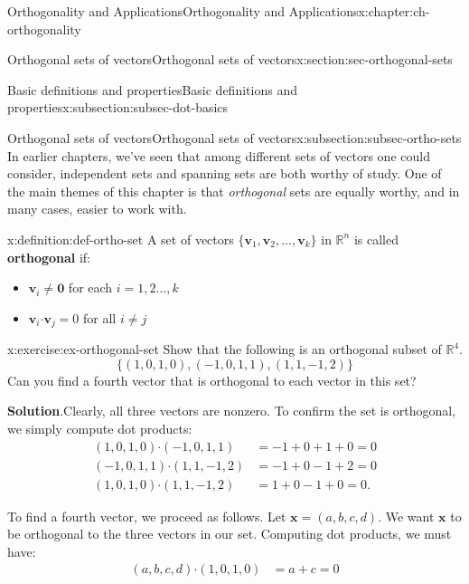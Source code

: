 \documentclass[oneside,10pt,]{book}
\newcommand{\blocktitlefont}{\relax}
\newcommand{\terminology}[1]{\textbf{#1}}
\numberwithin{equation}{section}
\newcommand{\R}{\mathbb{R}}
\newcommand{\dotp}{\!\boldsymbol{\cdot}\!}
\newcommand{\vv}{\mathbf{v}}
\newcommand{\xx}{\mathbf{x}}
\newcommand{\amp}{&}
\begin{document}
\begin{chapterptx}{Orthogonality and Applications}{}{Orthogonality and Applications}{}{}{x:chapter:ch-orthogonality}
\begin{sectionptx}{Orthogonal sets of vectors}{}{Orthogonal sets of vectors}{}{}{x:section:sec-orthogonal-sets}
\begin{subsectionptx}{Basic definitions and properties}{}{Basic definitions and properties}{}{}{x:subsection:subsec-dot-basics}
\end{subsectionptx}
%
%
\typeout{************************************************}
\typeout{************************************************}
%
\begin{subsectionptx}{Orthogonal sets of vectors}{}{Orthogonal sets of vectors}{}{}{x:subsection:subsec-ortho-sets}
In earlier chapters, we've seen that among different sets of vectors one could consider, independent sets and spanning sets are both worthy of study. One of the main themes of this chapter is that \emph{orthogonal} sets are equally worthy, and in many cases, easier to work with.%
\begin{definition}{}{x:definition:def-ortho-set}%
A set of vectors \(\{\vv_1,\vv_2,\ldots, \vv_k\}\) in \(\R^n\) is called \terminology{orthogonal} if:%
\begin{itemize}[label=\textbullet]
\item{}\(\vv_i\neq \mathbf{0}\) for each \(i=1,2\ldots, k\)%
\item{}\(\vv_i\dotp\vv_j = 0\) for all \(i\neq j\)%
\end{itemize}
%
\end{definition}
\begin{inlineexercise}{}{x:exercise:ex-orthogonal-set}%
Show that the following is an orthogonal subset of \(\R^4\).%
\begin{equation*}
\{(1,0,1,0), (-1,0,1,1), (1,1,-1,2)\}
\end{equation*}
Can you find a fourth vector that is orthogonal to each vector in this set?%
\par\smallskip%
\noindent\textbf{\blocktitlefont Solution}.\label{g:solution:idm45936166071552}{}\hypertarget{g:solution:idm45936166071552}{}\quad{}Clearly, all three vectors are nonzero. To confirm the set is orthogonal, we simply compute dot products:%
\begin{align*}
(1,0,1,0)\dotp (-1,0,1,1)\amp =-1+0+1+0=0\\
(-1,0,1,1)\dotp (1,1,-1,2)\amp =-1+0-1+2=0\\
(1,0,1,0)\dotp (1,1,-1,2) \amp = 1+0-1+0=0\text{.}
\end{align*}
%
\par
To find a fourth vector, we proceed as follows. Let \(\xx=(a,b,c,d)\). We want \(\xx\) to be orthogonal to the three vectors in our set. Computing dot products, we must have:%
\begin{align*}
(a,b,c,d)\dotp (1,0,1,0) \amp = a+c=0 \\

\end{align*}
\end{inlineexercise}
\end{subsectionptx}
\end{sectionptx}
\end{chapterptx}
\end{document}

